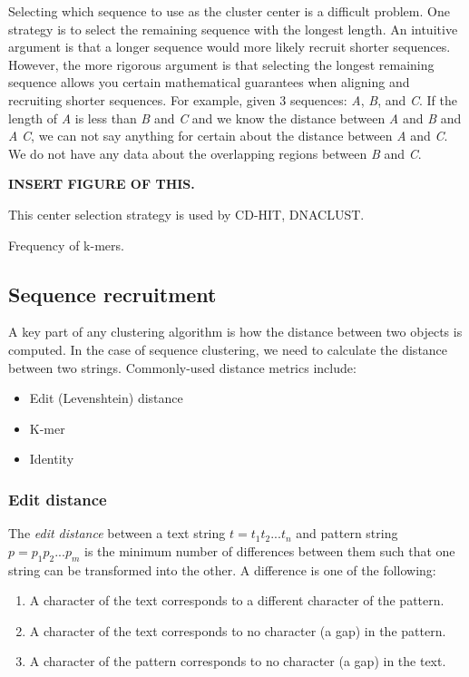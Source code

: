 Selecting which sequence to use as the cluster center is a difficult problem.
One strategy is to select the remaining sequence with the longest length.
An intuitive argument is that a longer sequence would more likely recruit shorter sequences.
However, the more rigorous argument is that selecting the longest remaining sequence allows you certain mathematical guarantees when aligning and recruiting shorter sequences.
For example, given 3 sequences: \emph{A}, \emph{B}, and \emph{C}.  If the length of \emph{A} is less than \emph{B} and \emph{C} and we know the distance between \emph{A} and \emph{B} and \emph{A} \emph{C}, we can not say anything for certain about the distance between \emph{A} and \emph{C}.
We do not have any data about the overlapping regions between \emph{B} and \emph{C}.

{\bf INSERT FIGURE OF THIS.}

This center selection strategy is used by CD-HIT\cite{li_clustering_2001}, DNACLUST\cite{ghodsi_dnaclust:_2011}.

Frequency of k-mers.

\subsection{Sequence recruitment}

A key part of any clustering algorithm is how the distance between two objects is computed.
In the case of sequence clustering, we need to calculate the distance between two strings.
Commonly-used distance metrics include:

\begin{itemize}

  \item Edit (Levenshtein) distance
  \item K-mer
  \item Identity

\end{itemize}

\subsubsection{Edit distance}

The \emph{edit distance} between a text string $t = t_1 t_2 ... t_n$ and pattern string $p = p_1 p_2  ... p_m$ is the minimum number of differences between them such that one string can be transformed into the other.
A difference is one of the following:

\begin{enumerate}

  \item A character of the text corresponds to a different character of the pattern.
  \item A character of the text corresponds to no character (a gap) in the pattern.
  \item A character of the pattern corresponds to no character (a gap) in the text.

\end{enumerate}

